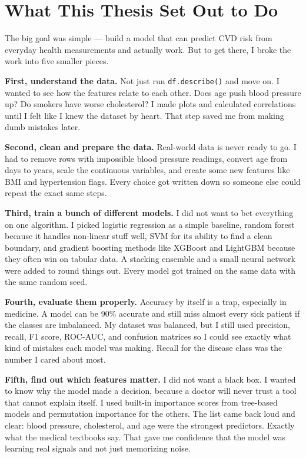 \documentclass[12pt, a4paper, oneside]{book}
\begin{document}
\section{What This Thesis Set Out to Do}
The big goal was simple — build a model that can predict CVD risk from everyday health measurements and actually work. But to get there, I broke the work into five smaller pieces.

\textbf{First, understand the data.} Not just run \texttt{df.describe()} and move on. I wanted to see how the features relate to each other. Does age push blood pressure up? Do smokers have worse cholesterol? I made plots and calculated correlations until I felt like I knew the dataset by heart. That step saved me from making dumb mistakes later.

\textbf{Second, clean and prepare the data.} Real-world data is never ready to go. I had to remove rows with impossible blood pressure readings, convert age from days to years, scale the continuous variables, and create some new features like BMI and hypertension flags. Every choice got written down so someone else could repeat the exact same steps.

\textbf{Third, train a bunch of different models.} I did not want to bet everything on one algorithm. I picked logistic regression as a simple baseline, random forest because it handles non-linear stuff well, SVM for its ability to find a clean boundary, and gradient boosting methods like XGBoost and LightGBM because they often win on tabular data. A stacking ensemble and a small neural network were added to round things out. Every model got trained on the same data with the same random seed.

\textbf{Fourth, evaluate them properly.} Accuracy by itself is a trap, especially in medicine. A model can be 90\% accurate and still miss almost every sick patient if the classes are imbalanced. My dataset was balanced, but I still used precision, recall, F1 score, ROC-AUC, and confusion matrices so I could see exactly what kind of mistakes each model was making. Recall for the disease class was the number I cared about most.

\textbf{Fifth, find out which features matter.} I did not want a black box. I wanted to know why the model made a decision, because a doctor will never trust a tool that cannot explain itself. I used built-in importance scores from tree-based models and permutation importance for the others. The list came back loud and clear: blood pressure, cholesterol, and age were the strongest predictors. Exactly what the medical textbooks say. That gave me confidence that the model was learning real signals and not just memorizing noise.
\end{document}
